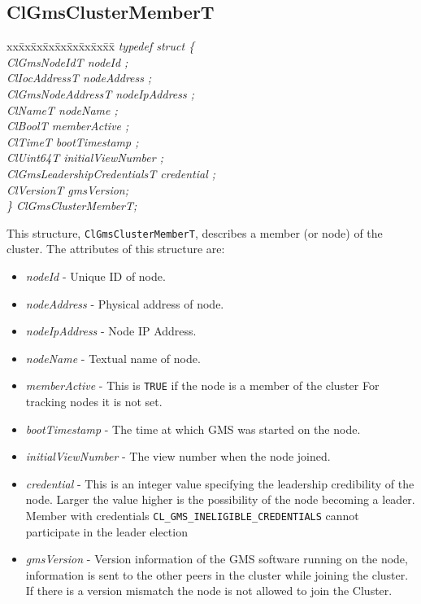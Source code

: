 \begin{flushleft}
\subsection{ClGmsClusterMemberT}
\begin{tabbing}
xx\=xx\=xx\=xx\=xx\=xx\=xx\=xx\=xx\=\kill
\textit{typedef struct \{}\\
\>\>\>\>\textit{ClGmsNodeIdT                nodeId ;}\\
\>\>\>\>\textit{ClIocAddressT               nodeAddress ;}\\
\>\>\>\>\textit{ClGmsNodeAddressT nodeIpAddress ;}\\
\>\>\>\>\textit{ClNameT                     nodeName ;}\\
\>\>\>\>\textit{ClBoolT                     memberActive ;}\\
\>\>\>\>\textit{ClTimeT                     bootTimestamp ;}\\
\>\>\>\>\textit{ClUint64T                   initialViewNumber ;}\\
\>\>\>\>\textit{ClGmsLeadershipCredentialsT credential ;}\\
\>\>\>\>\textit{ClVersionT gmsVersion;}\\
\textit{\} ClGmsClusterMemberT;}\end{tabbing}
This structure, {\tt{ClGmsClusterMemberT}}, describes a member (or node) of the cluster.
The attributes of this structure are:
\begin{itemize}
\item
\textit{nodeId} - Unique ID of node.
\item
\textit{nodeAddress} - Physical address of node.
\item
\textit{nodeIpAddress} - Node IP Address.
\item
\textit{nodeName} - Textual name of node.
\item
\textit{memberActive} -  This is {\tt{TRUE}} if the node is a member of the cluster
 For tracking nodes it is not set.
\item
\textit{bootTimestamp} - The time at which GMS was started on the node.
\item
\textit{initialViewNumber} - The view number when the node joined.
\item
\textit{credential} -  This is an integer value specifying the
 leadership credibility of the node. Larger the value higher is the
 possibility of the node becoming a leader. Member with credentials
 {\tt{CL\_\-GMS\_\-INELIGIBLE\_\-CREDENTIALS}} cannot participate in the leader election
\item
\textit{gmsVersion} -  Version information of the GMS software running on the node, information is
 sent to the other peers in the cluster while joining the cluster. If
 there is a version mismatch the node is not allowed to join the Cluster.
\end{itemize}






\end{flushleft}
